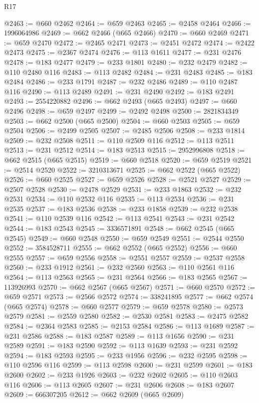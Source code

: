 \begin{lexlean}{R17}
\begin{coremodule}
@2463 := @660 @2462
@2464 := @659 @2463
@2465 := @2458 @2464
@2466 := 1996064986
@2469 := @662 @2466 (@665 @2466)
@2470 := @660 @2469
@2471 := @659 @2470
@2472 := @2465 @2471
@2473 := @2451 @2472
@2474 := @2422 @2473
@2475 := @2367 @2474
@2476 := @113 @1611
@2477 := @231 @2476
@2478 := @183 @2477
@2479 := @233 @1801
@2480 := @232 @2479
@2482 := @110 @2480 @116
@2483 := @113 @2482
@2484 := @231 @2483
@2485 := @183 @2484
@2486 := @233 @1791
@2487 := @232 @2486
@2489 := @110 @2487 @116
@2490 := @113 @2489
@2491 := @231 @2490
@2492 := @183 @2491
@2493 := 2554220882
@2496 := @662 @2493 (@665 @2493)
@2497 := @660 @2496
@2498 := @659 @2497
@2499 := @2492 @2498
@2500 := 2821834349
@2503 := @662 @2500 (@665 @2500)
@2504 := @660 @2503
@2505 := @659 @2504
@2506 := @2499 @2505
@2507 := @2485 @2506
@2508 := @233 @1814
@2509 := @232 @2508
@2511 := @110 @2509 @116
@2512 := @113 @2511
@2513 := @231 @2512
@2514 := @183 @2513
@2515 := 2952996808
@2518 := @662 @2515 (@665 @2515)
@2519 := @660 @2518
@2520 := @659 @2519
@2521 := @2514 @2520
@2522 := 3210313671
@2525 := @662 @2522 (@665 @2522)
@2526 := @660 @2525
@2527 := @659 @2526
@2528 := @2521 @2527
@2529 := @2507 @2528
@2530 := @2478 @2529
@2531 := @233 @1863
@2532 := @232 @2531
@2534 := @110 @2532 @116
@2535 := @113 @2534
@2536 := @231 @2535
@2537 := @183 @2536
@2538 := @233 @1858
@2539 := @232 @2538
@2541 := @110 @2539 @116
@2542 := @113 @2541
@2543 := @231 @2542
@2544 := @183 @2543
@2545 := 3336571891
@2548 := @662 @2545 (@665 @2545)
@2549 := @660 @2548
@2550 := @659 @2549
@2551 := @2544 @2550
@2552 := 3584528711
@2555 := @662 @2552 (@665 @2552)
@2556 := @660 @2555
@2557 := @659 @2556
@2558 := @2551 @2557
@2559 := @2537 @2558
@2560 := @233 @1912
@2561 := @232 @2560
@2563 := @110 @2561 @116
@2564 := @113 @2563
@2565 := @231 @2564
@2566 := @183 @2565
@2567 := 113926993
@2570 := @662 @2567 (@665 @2567)
@2571 := @660 @2570
@2572 := @659 @2571
@2573 := @2566 @2572
@2574 := 338241895
@2577 := @662 @2574 (@665 @2574)
@2578 := @660 @2577
@2579 := @659 @2578
@2580 := @2573 @2579
@2581 := @2559 @2580
@2582 := @2530 @2581
@2583 := @2475 @2582
@2584 := @2364 @2583
@2585 := @2153 @2584
@2586 := @113 @1689
@2587 := @231 @2586
@2588 := @183 @2587
@2589 := @113 @1656
@2590 := @231 @2589
@2591 := @183 @2590
@2592 := @113 @1639
@2593 := @231 @2592
@2594 := @183 @2593
@2595 := @233 @1956
@2596 := @232 @2595
@2598 := @110 @2596 @116
@2599 := @113 @2598
@2600 := @231 @2599
@2601 := @183 @2600
@2602 := @233 @1926
@2603 := @232 @2602
@2605 := @110 @2603 @116
@2606 := @113 @2605
@2607 := @231 @2606
@2608 := @183 @2607
@2609 := 666307205
@2612 := @662 @2609 (@665 @2609)

\end{coremodule}
\end{lexlean}
